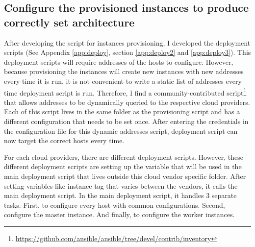\subsection{Configure the provisioned instances to produce correctly set architecture}

After developing the script for instances provisioning, I developed the deployment scripts (See Appendix \ref{app:deploy}, section \ref{app:deploy2} and \ref{app:deploy3}). This deployment scripts will require addresses of the hosts to configure. However, because provisioning the instances will create new instances with new addresses every time it is run, it is not convenient to write a static list of addresses every time deployment script is run. Therefore, I find a community-contributed script\footnote{\url{https://github.com/ansible/ansible/tree/devel/contrib/inventory}} that allows addresses to be dynamically queried to the respective cloud providers. Each of this script lives in the same folder as the provisioning script and has a different configuration that needs to be set once. After entering the credentials in the configuration file for this dynamic addresses script, deployment script can now target the correct hosts every time.

For each cloud providers, there are different deployment scripts. However, these different deployment scripts are setting up the variable that will be used in the main deployment script that lives outside this cloud vendor specific folder. After setting variables like instance tag that varies between the vendors, it calls the main deployment script. In the main deployment script, it handles 3 separate tasks. First, to configure every host with common configurations. Second, configure the master instance. And finally, to configure the worker instances.

